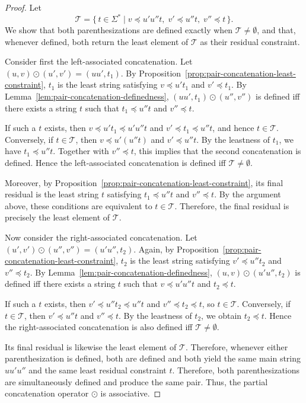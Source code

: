 \begin{proof}
Let
\[
\mathcal{T}
=
\{\,t\in\Sigma^*
\mid
v\preceq u'u''t,\;
v'\preceq u''t,\;
v''\preceq t
\,\}.
\]
We show that both parenthesizations are defined exactly when
$\mathcal{T}\neq\emptyset$, and that, whenever defined, both return
the least element of $\mathcal{T}$ as their residual constraint.

Consider first the left-associated concatenation. Let
$(u,v)\odot(u',v')=(uu',t_1)$. By
Proposition~\ref{prop:pair-concatenation-least-constraint}, $t_1$ is
the least string satisfying $v\preceq u't_1$ and $v'\preceq t_1$.
By Lemma~\ref{lem:pair-concatenation-definedness},
$(uu',t_1)\odot(u'',v'')$ is defined iff there exists a string $t$
such that $t_1\preceq u''t$ and $v''\preceq t$.

If such a $t$ exists, then
$v\preceq u't_1\preceq u'u''t$ and
$v'\preceq t_1\preceq u''t$, and hence $t\in\mathcal{T}$.
Conversely, if $t\in\mathcal{T}$, then
$v\preceq u'(u''t)$ and $v'\preceq u''t$. By the leastness of $t_1$,
we have $t_1\preceq u''t$. Together with $v''\preceq t$, this implies
that the second concatenation is defined. Hence the left-associated
concatenation is defined iff $\mathcal{T}\neq\emptyset$.

Moreover, by Proposition~\ref{prop:pair-concatenation-least-constraint},
its final residual is the least string $t$ satisfying
$t_1\preceq u''t$ and $v''\preceq t$. By the argument above, these
conditions are equivalent to $t\in\mathcal{T}$. Therefore, the final
residual is precisely the least element of $\mathcal{T}$.

Now consider the right-associated concatenation. Let
$(u',v')\odot(u'',v'')=(u'u'',t_2)$. Again, by
Proposition~\ref{prop:pair-concatenation-least-constraint}, $t_2$ is
the least string satisfying $v'\preceq u''t_2$ and $v''\preceq t_2$.
By Lemma~\ref{lem:pair-concatenation-definedness},
$(u,v)\odot(u'u'',t_2)$ is defined iff there exists a string $t$ such
that $v\preceq u'u''t$ and $t_2\preceq t$.

If such a $t$ exists, then
$v'\preceq u''t_2\preceq u''t$ and $v''\preceq t_2\preceq t$,
so $t\in\mathcal{T}$. Conversely, if $t\in\mathcal{T}$, then
$v'\preceq u''t$ and $v''\preceq t$. By the leastness of $t_2$,
we obtain $t_2\preceq t$. Hence the right-associated concatenation is
also defined iff $\mathcal{T}\neq\emptyset$.

Its final residual is likewise the least element of $\mathcal{T}$.
Therefore, whenever either parenthesization is defined, both are
defined and both yield the same main string $uu'u''$ and the same
least residual constraint $t$. Therefore, both parenthesizations are simultaneously defined and produce the same pair. Thus, the partial concatenation operator \(\odot\) is associative.
\end{proof}

